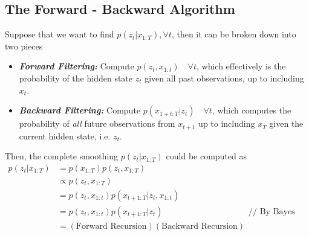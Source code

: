 \documentclass[11pt]{article}
\begin{document}
\subsection{The Forward - Backward Algorithm}
Suppose that we want to find $p(z_t | x_{1:T}), \forall t$, then it can be broken down into two pieces
\begin{itemize}
    \item \textit{\textbf{Forward Filtering:}} Compute $p\left(z_{t}, x_{1: t}\right) \quad \forall t$, which effectively is the probability of the hidden state $z_t$ given all past observations, up to including $x_t$. 
    \item \textbf{\textit{Backward Filtering:}} Compute $p\left(x_{1+t: T} | z_{t}\right)\quad \forall t$, which computes the probability of \textit{all} future observations from $x_{t+1}$ up to including $x_T$ given the current hidden state, i.e. $z_t$.
\end{itemize}
Then, the complete smoothing $p(z_t | x_{1:T})$ could be computed as
\begin{align}
    p\left(z_{t} | x_{1: T}\right)
    &= p\left(x_{1:T}\right)p\left(z_{t}, x_{1: T}\right) \\
    &\propto p\left(z_{t}, x_{1: T}\right) \\
    &=p\left(z_{t}, x_{1: t}\right) p\left(x_{t+1: T} | z_{t}, x_{1: t}\right) \\
    &=p\left(z_{t}, x_{1: t}\right) p\left(x_{t+1: T} | z_{t}\right) && \text{// By Bayes Ball} \\
    &=(\text{Forward Recursion})(\text{Backward Recursion})
\end{align}
\end{document}
